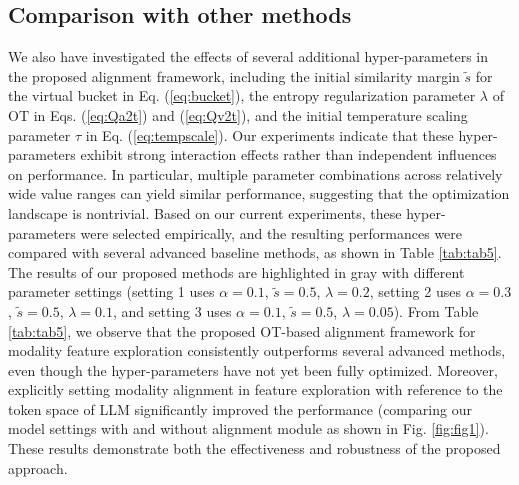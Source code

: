 \documentclass[conference]{IEEEtran}
\begin{document}


\subsection{Comparison with other methods}
We also have investigated the effects of several additional hyper-parameters in the proposed alignment framework, including the initial similarity margin $\tilde{s}$ for the virtual bucket in Eq. (\ref{eq:bucket}), the entropy regularization parameter $\lambda$ of OT in Eqs. (\ref{eq:Qa2t}) and (\ref{eq:Qv2t}), and the initial temperature scaling parameter $\tau$ in Eq. (\ref{eq:tempscale}). Our experiments indicate that these hyper-parameters exhibit strong interaction effects rather than independent influences on performance. In particular, multiple parameter combinations across relatively wide value ranges can yield similar performance, suggesting that the optimization landscape is nontrivial. Based on our current experiments, these hyper-parameters were selected empirically, and the resulting performances were compared with several advanced baseline methods, as shown in Table \ref{tab:tab5}. The results of our proposed methods are highlighted in gray with different parameter settings (setting 1 uses $\alpha=0.1$, $\tilde{s}=0.5$, $\lambda=0.2$, setting 2 uses $\alpha=0.3$, $\tilde{s}=0.5$, $\lambda=0.1$, and setting 3 uses $\alpha=0.1$, $\tilde{s}=0.5$, $\lambda=0.05$). From Table \ref{tab:tab5}, we observe that the proposed OT-based alignment framework for modality feature exploration consistently outperforms several advanced methods, even though the hyper-parameters have not yet been fully optimized. Moreover, explicitly setting modality alignment in feature exploration with reference to the token space of LLM significantly improved the performance (comparing our model settings with and without alignment module as shown in Fig. \ref{fig:fig1}). These results demonstrate both the effectiveness and robustness of the proposed approach. 
\end{document}
